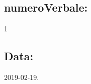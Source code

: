 \documentclass[a4paper, oneside, openany, dvipsnames, table]{article}
\begin{document}
\subsection{numeroVerbale:} 1

\subsection{Data:} 2019-02-19.
\end{document}
